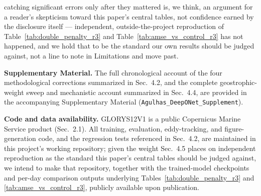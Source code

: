 \documentclass[11pt]{article}
\begin{document}
catching significant errors only after they mattered is, we think, an argument for a reader's skepticism toward this paper's central tables, not confidence earned by the disclosure itself --- independent, outside-the-project reproduction of Table~\ref{tab:double_penalty_r3} and Table~\ref{tab:amse_vs_control_r3} has not happened, and we hold that to be the standard our own results should be judged against, not a line to note in Limitations and move past.

\textbf{Supplementary Material.} The full chronological account of the four methodological corrections summarized in Sec.~4.2, and the complete geostrophic-weight sweep and mechanistic account summarized in Sec.~4.4, are provided in the accompanying Supplementary Material (\texttt{Agulhas\allowbreak\_DeepONet\allowbreak\_Supplement}).

\textbf{Code and data availability.} GLORYS12V1 is a public Copernicus Marine Service product (Sec.~2.1). All training, evaluation, eddy-tracking, and figure-generation code, and the regression tests referenced in Sec.~4.2, are maintained in this project's working repository; given the weight Sec.~4.5 places on independent reproduction as the standard this paper's central tables should be judged against, we intend to make that repository, together with the trained-model checkpoints and per-day comparison outputs underlying Tables~\ref{tab:double_penalty_r3} and \ref{tab:amse_vs_control_r3}, publicly available upon publication.
\end{document}
